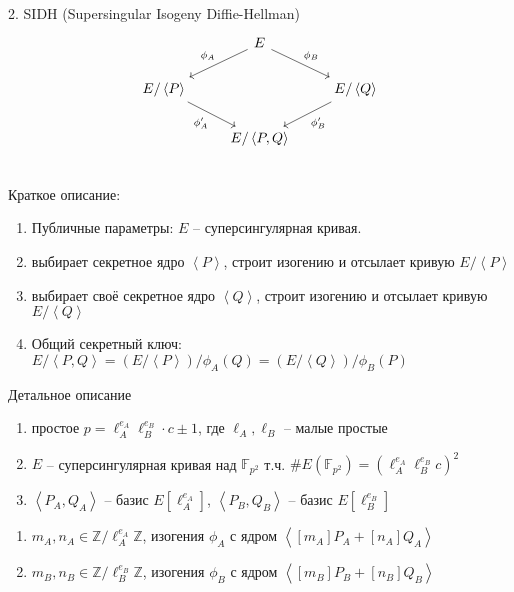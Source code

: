 \documentclass{beamer}
\begin{document}
\begin{frame}[fragile]{2. SIDH (Supersingular Isogeny Diffie-Hellman)}
	\[
	\begin{tikzcd}
		&\arrow{ld}[swap]{\phi_{A}} E  \arrow{rd}{\phi_{B}} & \\
		E/\left<P\right>\arrow{rd}[swap]{\phi'_{A}}  &  & \arrow{ld}{\phi'_{B}}  E/\left< Q \right> \\
		& E/\left< P, Q \right> &\\
	\end{tikzcd}
	\]
	Краткое описание:
	\begin{enumerate}
		\item Публичные параметры: $E$ -- суперсингулярная кривая.
		\item \structure{{\Large\faUserSecret}} выбирает секретное ядро $\left<P\right>$, строит изогению и отсылает \structure{{\Large\faCat}} кривую
		$E/\left<P\right>$
		\item \structure{{\Large\faCat}} выбирает своё секретное ядро $\left<Q\right>$, строит изогению и отсылает \structure{{\Large\faUserSecret}} кривую
		$E/\left<Q\right>$
		\item Общий секретный ключ: $E/\left<P,Q\right> = (E/\left<P\right>)/\phi_A(Q) = (E/\left<Q\right>)/\phi_B(P)$
	\end{enumerate}
\end{frame}

\begin{frame}{Детальное описание}
	\begin{enumerate}
		\item простое
		$p = \ell_A^{e_A} \ell_B^{e_B} \cdot c \pm 1$, где $\ell_A, \ell_B$ -- малые простые
		\item $E$ -- суперсингулярная кривая над $\mathbb{F}_{p^2}$ т.ч. $\#E(\mathbb{F}_{p^2}) = (\ell_A^{e_A} \ell_{B}^{e_B} c)^2$
		\item $\left<P_A, Q_A\right>$ -- базис $E[\ell_A^{e_A}]$, $\left<P_B, Q_B\right>$ -- базис $E[\ell_B^{e_B}]$
	\end{enumerate}
	\vspace*{1em}
	\begin{enumerate}
		\item[\structure{{\Large\faUserSecret}}] $m_A, n_A \in \mathbb{Z}/\ell_A^{e_A} \mathbb{Z}$, изогения $\phi_A$ с ядром $\left< [m_A]P_A + [n_A]Q_A \right>$
		\item[\structure{{\Large\faCat}}] $m_B, n_B \in \mathbb{Z}/\ell_B^{e_B} \mathbb{Z}$, изогения $\phi_B$ с ядром $\left< [m_B]P_B + [n_B]Q_B \right>$
	\end{enumerate}
\end{frame}
\end{document}
